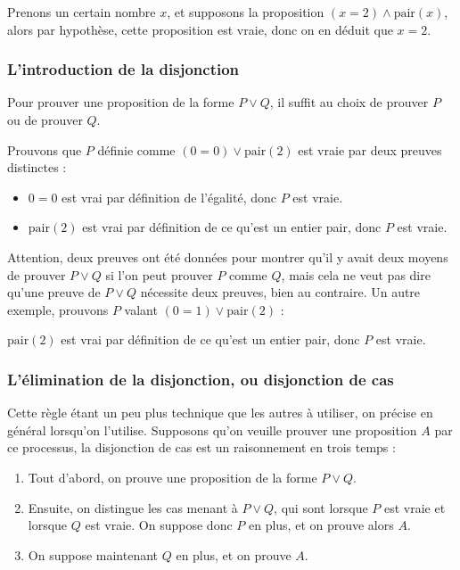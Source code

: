 \begin{expl}
    Prenons un certain nombre $x$, et supposons la proposition $(x = 2) \land \mathrm{pair}(x)$, alors par hypothèse, cette proposition est vraie, donc on en déduit que $x=2$.
\end{expl}

\subsubsection{L'introduction de la disjonction}

Pour prouver une proposition de la forme $P\lor Q$, il suffit au choix de prouver $P$ ou de prouver $Q$.

\begin{expl}
    Prouvons que $P$ définie comme $(0=0)\lor \mathrm{pair}(2)$ est vraie par deux preuves distinctes :
    \begin{itemize}[label=$\bullet$]
        \item $0=0$ est vrai par définition de l'égalité, donc $P$ est vraie.
        \item $\mathrm{pair}(2)$ est vrai par définition de ce qu'est un entier pair, donc $P$ est vraie.
    \end{itemize}
    \vspace{0.5cm}
    
    Attention, deux preuves ont été données pour montrer qu'il y avait deux moyens de prouver $P\lor Q$ si l'on peut prouver $P$ comme $Q$, mais cela ne veut pas dire qu'une preuve de  $P\lor Q$ nécessite deux preuves, bien au contraire. Un autre exemple, prouvons $P$ valant $(0=1)\lor \mathrm{pair}(2)$ :
    \vspace{0.5cm}
    
    $\mathrm{pair}(2)$ est vrai par définition de ce qu'est un entier pair, donc $P$ est vraie.
\end{expl}

\subsubsection{L'élimination de la disjonction, ou disjonction de cas}

Cette règle étant un peu plus technique que les autres à utiliser, on précise en général lorsqu'on l'utilise. Supposons qu'on veuille prouver une proposition $A$ par ce processus, la disjonction de cas est un raisonnement en trois temps :

\begin{enumerate}
    \item Tout d'abord, on prouve une proposition de la forme $P\lor Q$.
    \item Ensuite, on distingue les cas menant à $P\lor Q$, qui sont lorsque $P$ est vraie et lorsque $Q$ est vraie. On suppose donc $P$ en plus, et on prouve alors $A$.
    \item On suppose maintenant $Q$ en plus, et on prouve $A$.
\end{enumerate}

